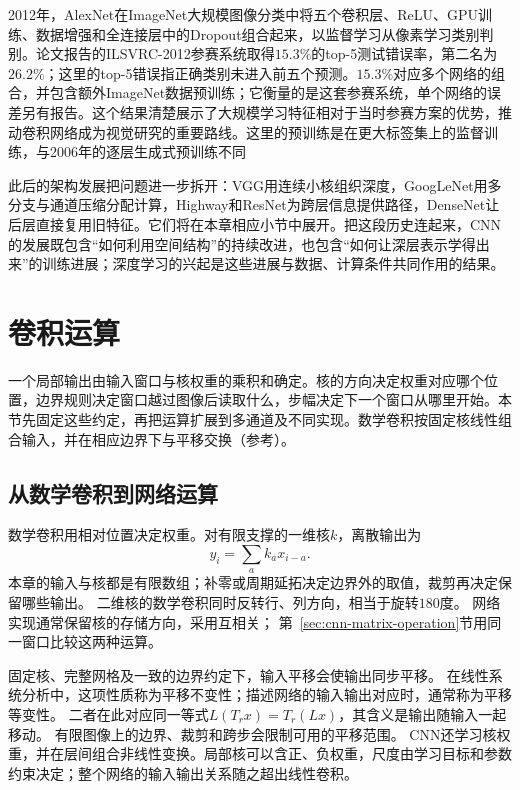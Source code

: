 2012年，AlexNet在ImageNet大规模图像分类中将五个卷积层、ReLU、GPU训练、数据增强和全连接层中的Dropout组合起来，以监督学习从像素学习类别判别。论文报告的ILSVRC-2012参赛系统取得$15.3\%$的top-5测试错误率，第二名为$26.2\%$；这里的top-5错误指正确类别未进入前五个预测。$15.3\%$对应多个网络的组合，并包含额外ImageNet数据预训练；它衡量的是这套参赛系统，单个网络的误差另有报告。这个结果清楚展示了大规模学习特征相对于当时参赛方案的优势，推动卷积网络成为视觉研究的重要路线。这里的预训练是在更大标签集上的监督训练，与2006年的逐层生成式预训练不同

此后的架构发展把问题进一步拆开：VGG用连续小核组织深度，GoogLeNet用多分支与通道压缩分配计算，Highway和ResNet为跨层信息提供路径，DenseNet让后层直接复用旧特征。它们将在本章相应小节中展开。把这段历史连起来，CNN的发展既包含“如何利用空间结构”的持续改进，也包含“如何让深层表示学得出来”的训练进展；深度学习的兴起是这些进展与数据、计算条件共同作用的结果。

\section{卷积运算}
\label{sec:cnn-convolution}

一个局部输出由输入窗口与核权重的乘积和确定。核的方向决定权重对应哪个位置，边界规则决定窗口越过图像后读取什么，步幅决定下一个窗口从哪里开始。本节先固定这些约定，再把运算扩展到多通道及不同实现。数学卷积按固定核线性组合输入，并在相应边界下与平移交换（参考）。

\subsection{从数学卷积到网络运算}
\label{sec:cnn-convolution-definition}

数学卷积用相对位置决定权重。对有限支撑的一维核$k$，离散输出为
\[
  y_i=\sum_a k_a x_{i-a}.
\]
本章的输入与核都是有限数组；补零或周期延拓决定边界外的取值，裁剪再决定保留哪些输出。
二维核的数学卷积同时反转行、列方向，相当于旋转$180$度。
网络实现通常保留核的存储方向，采用互相关；
第~\ref{sec:cnn-matrix-operation}节用同一窗口比较这两种运算。

固定核、完整网格及一致的边界约定下，输入平移会使输出同步平移。
在线性系统分析中，这项性质称为平移不变性；描述网络的输入输出对应时，通常称为平移等变性。
二者在此对应同一等式$L(T_rx)=T_r(Lx)$，其含义是输出随输入一起移动。
有限图像上的边界、裁剪和跨步会限制可用的平移范围。
CNN还学习核权重，并在层间组合非线性变换。局部核可以含正、负权重，尺度由学习目标和参数约束决定；整个网络的输入输出关系随之超出线性卷积。

